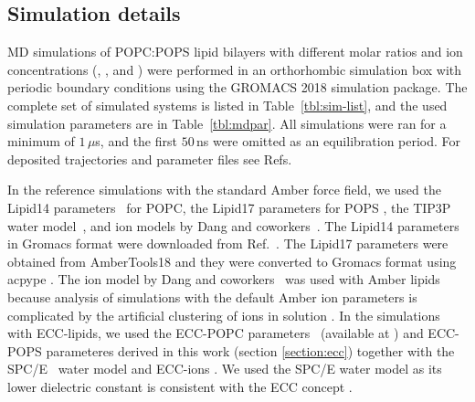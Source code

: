 \documentclass[journal=jpcbfk,manuscript=article]{achemso}
\begin{document}
\subsection{Simulation details} 

MD simulations of POPC:POPS lipid bilayers with different molar ratios 
and ion concentrations (, ,  and )
were performed in an orthorhombic simulation box with periodic boundary conditions
using the GROMACS 2018 \cite{Abraham15} simulation package. 
The complete set of simulated systems is listed in Table~\ref{tbl:sim-list},
and the used simulation parameters are in Table~\ref{tbl:mdpar}. 
All simulations were ran for a minimum of $1 \, \mu$s,
and the first  $50 \,$ns were omitted as an equilibration period. 
For deposited trajectories and parameter files see 
Refs.~

In the reference simulations with the standard Amber force field,
we used the Lipid14 parameters~\cite{dickson14} for POPC, the Lipid17 parameters for POPS \cite{lipid17-future},
the TIP3P water model~\cite{jorgensen83}, and ion models by Dang and coworkers~\cite{smith94,chang1999,dang2006}.
The Lipid14 parameters in Gromacs format were downloaded from Ref.~. 
The Lipid17 parameters were obtained from AmberTools18 \cite{amber18} 
and they were converted to Gromacs format using acpype \cite{acpype}.  
The ion model by Dang and coworkers~\cite{smith94,chang1999,dang2006} was used with Amber lipids because
analysis of simulations with the default Amber ion parameters is complicated by the artificial
clustering of ions in solution \cite{nmrlipids_proj4}.
In the simulations with ECC-lipids,
we used the ECC-POPC parameters~\cite{melcr18} (available at \cite{ECC-POPC_nacl_cacl2_files}) and 
ECC-POPS parameteres derived in this work (section \ref{section:ecc}) 
together with the SPC/E~\cite{Berendsen1987} water model and 
ECC-ions \cite{martinek17, kohagen16, Pluharova2014}.
We used the SPC/E water model as its lower dielectric constant is consistent with the
ECC concept \cite{leontyev11,leontyev14}.
\end{document}
